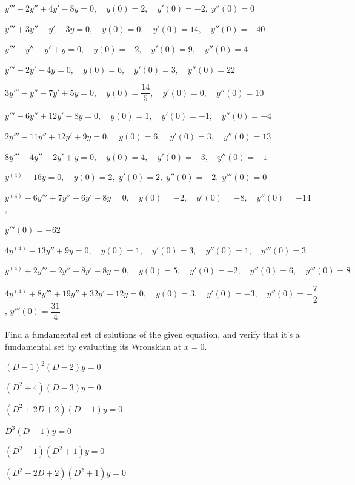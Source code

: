 \begin{exerciselist}
\item\label{exer:9.2.15}$y'''-2y''+4y'-8y=0, \quad  y(0)=2,\quad y'(0)=-2,\;  y''(0)=0$

\item\label{exer:9.2.16}$y'''+3y''-y'-3y=0, \quad  y(0)=0,\quad y'(0)=14,\quad y''(0)=-40$

\item\label{exer:9.2.17}\CGex
$y'''-y''-y'+y=0, \quad  y(0)=-2,\quad y'(0)=9,\quad y''(0)=4$

\item\label{exer:9.2.18}\CGex
$y'''-2y'-4y=0, \quad  y(0)=6,\quad y'(0)=3,\quad y''(0)=22$

\item\label{exer:9.2.19}\CGex
$3y'''-y''-7y'+5y=0, \quad  y(0)=\dfrac{14}{5},\quad y'(0)=0,\quad y''(0)=10$

\item\label{exer:9.2.20}$y'''-6y''+12y'-8y=0, \quad  y(0)=1,\quad y'(0)=-1,\quad y''(0)=-4$

\item\label{exer:9.2.21}$2y'''-11y''+12y'+9y=0, \quad  y(0)=6,\quad y'(0)=3,\quad y''(0)=13$

\item\label{exer:9.2.22}$8y'''-4y''-2y'+y=0, \quad  y(0)=4,\quad y'(0)=-3,\quad y''(0)=-1$

\item\label{exer:9.2.23}$y^{(4)}-16y=0, \quad   y(0)=2,\;  y'(0)=2,\;  y''(0)=-2,\;  y'''(0)=0$

\item\label{exer:9.2.24}$y^{(4)}-6y'''+7y''+6y'-8y=0, \quad  y(0)=-2,\quad y'(0)=-8,\quad y''(0)=-14$,

 $y'''(0)=-62$

\item\label{exer:9.2.25}$4y^{(4)}-13y''+9y=0, \quad  y(0)=1,\quad y'(0)=3,\quad y''(0)=1,\quad y'''(0)=3$

\item\label{exer:9.2.26}$y^{(4)}+2y'''-2y''-8y'-8y=0, \quad  y(0)=5,\quad y'(0)=-2,\quad y''(0)=6,\quad y'''(0)=8$

\item\label{exer:9.2.27}\CGex
$4y^{(4)}+8y'''+19y''+32y'+12y=0, \quad  y(0)=3,\quad y'(0)=-3,\quad y''(0)=
-\dfrac{7}{2}$,
 $y'''(0)=\dfrac{31}{4}$

\item\label{exer:9.2.28}Find a fundamental set of solutions of the given equation, and verify
that it's a fundamental set by evaluating  its Wronskian
at $x=0$.
\begin{alist*}[columns=2]
\item $(D-1)^2(D-2)y=0$
\item $(D^2+4)(D-3)y=0$
\item $(D^2+2D+2)(D-1)y=0$
\item $D^3(D-1)y=0$
\item $(D^2-1)(D^2+1)y=0$
\item $(D^2-2D+2)(D^2+1)y=0$
\end{alist*}
\end{exerciselist}
